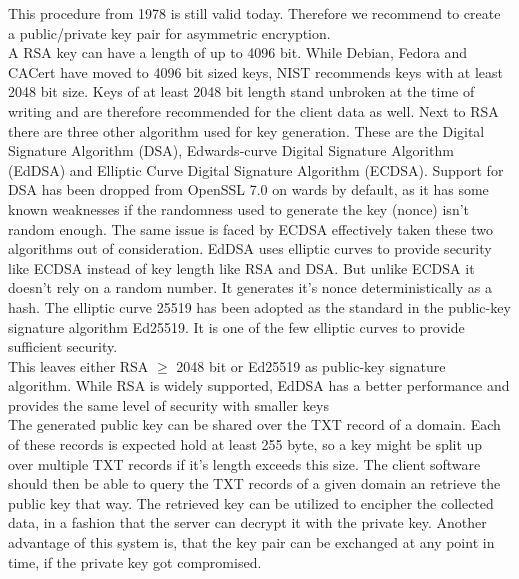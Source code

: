         This procedure from 1978 is still valid today. Therefore we recommend to create a  public/private key pair for asymmetric encryption.\\
        A RSA key can have a length of up to 4096 bit. While Debian, Fedora and CACert have moved to 4096 bit sized keys\cite{pocock_rsa_nodate}, NIST recommends keys with at least 2048 bit size\cite{barker_transitioning_2019}. Keys of at least 2048 bit length stand unbroken at the time of writing and are therefore recommended for the client data as well. 
        Next to RSA there are three other algorithm used for key generation. 
        These are the Digital Signature Algorithm (DSA), Edwards-curve Digital Signature Algorithm (EdDSA) and Elliptic Curve Digital Signature Algorithm (ECDSA)\cite{mody_comparing_2020}.
        Support for DSA has been dropped from OpenSSL 7.0 on wards by default, as it has some known weaknesses if the randomness used to generate the key (nonce) isn't random enough. The same issue is faced by ECDSA effectively taken these two algorithms out of consideration\cite{miller_ecdsa_2020}.
        EdDSA uses elliptic curves to provide security like ECDSA instead of key length like RSA and DSA. But unlike ECDSA it doesn't rely on a random number. It generates it's nonce deterministically as a hash. The elliptic curve 25519 has been adopted as the standard
        in the public-key signature algorithm Ed25519. It is one of the few elliptic curves to provide sufficient security\cite{mody_comparing_2020}.\\
        This leaves either RSA $\geq$ 2048 bit or Ed25519 as public-key signature algorithm.
        While RSA is widely supported, EdDSA has a better performance and provides the same level of security with smaller keys\cite{mody_comparing_2020}\\
        
        The generated public key can be shared over the TXT record of a domain. Each of these records is expected hold at least 255 byte, so a key might be split up over multiple TXT records if it's length exceeds this size.
        The client software should then be able to query the TXT records of a given domain an retrieve the public key that way.
        The retrieved key can be utilized to encipher the collected data, in a fashion that the server can decrypt it with the private key. Another advantage of this system is, that the key pair can be exchanged at any point in time, if the private key got compromised.
        
